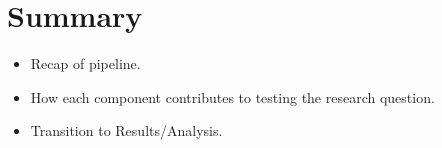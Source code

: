 
\section{Summary}
\begin{itemize}
    \item Recap of pipeline.
    \item How each component contributes to testing the research question.
    \item Transition to Results/Analysis.
\end{itemize}
